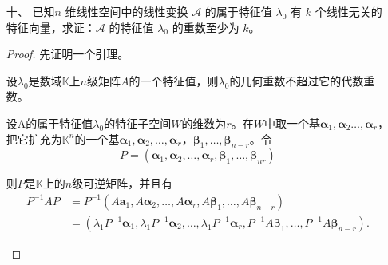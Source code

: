 \begin{enumerate}[1~]
\item[十、]
已知$n$ 维线性空间中的线性变换 $\mathscr{A}$ 的属于特征值 $\lambda_0$ 有 $k$ 个线性无关的特征向量，求证：$\mathscr{A}$ 的特征值 $\lambda_0$ 的重数至少为 $k$。
\begin{proof}
先证明一个引理。
\begin{lemma}
设$\lambda_0$是数域$\mathbb{K}$上$n$级矩阵$A$的一个特征值，则$\lambda_0$的几何重数不超过它的代数重数。
\end{lemma}
\begin{subproof}
设A的属于特征值$\lambda_0$的特征子空间$W$的维数为$r$。在$W$中取一个基$\boldsymbol { \alpha } _ { 1 } , \boldsymbol { \alpha } _ { 2 }\dots , \boldsymbol{\alpha }_ { r }$，把它扩充为$\mathbb{K}^n$的一个基$\boldsymbol { \alpha } _ { 1 } , \boldsymbol { \alpha } _ { 2 } , \dots , \boldsymbol { \alpha } _ { r }$，$ \boldsymbol { \beta } _ { 1 } , \dots , \boldsymbol { \beta } _ { n - r }$。令
\[
P = \left( \boldsymbol { \alpha } _ { 1 } , \boldsymbol { \alpha } _ { 2 } , \dots , \boldsymbol { \alpha } _ { r } , \boldsymbol { \beta } _ { 1 } , \dots , \boldsymbol { \beta } _ { n r } \right)
\]

则$P$是$\mathbb{K}$上的$n$级可逆矩阵，并且有\begin{align*}
P ^ { - 1 } A P &= P ^ { - 1 } \left( A \boldsymbol { a } _ { 1 } , A \boldsymbol { \alpha } _ { 2 } , \dots , A \boldsymbol { \alpha } _ { r } , A \boldsymbol { \beta } _ { 1 } , \dots , A \boldsymbol { \beta } _ { n - r } \right)\\
&= \left( \lambda _ { 1 } P ^ { - 1 } \boldsymbol { \alpha } _ { 1 } , \lambda _ { 1 } P ^ { - 1 } \boldsymbol { \alpha } _ { 2 } , \dots , \lambda _ { 1 } P ^ { - 1 } \boldsymbol { \alpha } _ { r } , P ^ { - 1 } A \boldsymbol { \beta } _ { 1 } , \dots , P ^ { - 1 } A \boldsymbol { \beta } _ { n - r } \right).
\end{align*}


\end{subproof}
\end{proof}
\end{enumerate}
